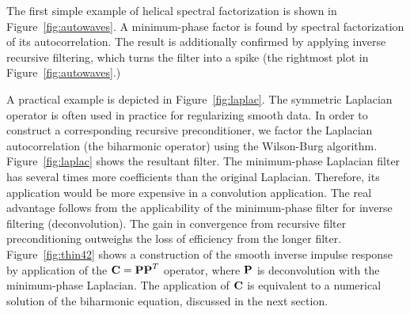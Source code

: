 
The first simple example of helical spectral factorization is shown in
Figure~\ref{fig:autowaves}. A minimum-phase factor is found by
spectral factorization of its autocorrelation. The result is
additionally confirmed by applying inverse recursive filtering, which
turns the filter into a spike (the rightmost plot in
Figure~\ref{fig:autowaves}.)


A practical example is depicted in Figure~\ref{fig:laplac}.  The
symmetric Laplacian operator is often used in practice for
regularizing smooth data. In order to construct a corresponding
recursive preconditioner, we factor the Laplacian autocorrelation
(the biharmonic operator) using the Wilson-Burg algorithm.
Figure~\ref{fig:laplac} shows the resultant filter. The minimum-phase
Laplacian filter has several times more coefficients than the original
Laplacian. Therefore, its application would be more expensive in a
convolution application. The real advantage follows from the
applicability of the minimum-phase filter for inverse filtering
(deconvolution). The gain in convergence from recursive filter
preconditioning outweighs the loss of efficiency from the longer
filter.  Figure~\ref{fig:thin42} shows a construction of the smooth
inverse impulse response by application of the $\bold{C} = \bold{P
  P}^T$ operator, where $\bold{P}$ is deconvolution with the
minimum-phase Laplacian. The application of $\bold{C}$ is equivalent
to a numerical solution of the biharmonic equation, discussed in the
next section.




